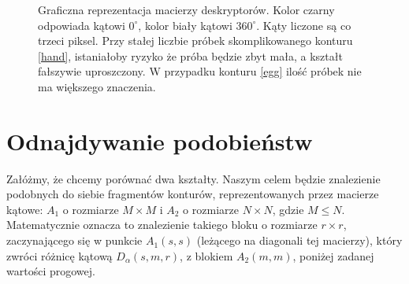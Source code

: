 \begin{figure}[h!] \centering {}
   \caption{Graficzna reprezentacja macierzy deskryptorów. Kolor
  czarny odpowiada kątowi $0^\circ$, kolor biały kątowi $360^\circ$. Kąty
  liczone są co trzeci piksel. Przy stałej liczbie próbek skomplikowanego
  konturu \ref{hand}, istaniałoby ryzyko że próba będzie zbyt mała, a kształt
  fałszywie uproszczony. W przypadku konturu \ref{egg} ilość próbek nie ma
  większego znaczenia.} \end{figure}

\section{Odnajdywanie podobieństw}

Załóżmy, że chcemy porównać dwa kształty. Naszym celem będzie znalezienie
podobnych do siebie fragmentów konturów, reprezentowanych przez macierze
kątowe: $A_{1}$ o rozmiarze $M \times M$ i $A_{2}$ o rozmiarze $N \times N$,
gdzie $M \leq N$.  Matematycznie oznacza to znalezienie takiego bloku o
rozmiarze $r \times r$, zaczynającego się w punkcie $A_1(s,s)$ (leżącego na
diagonali tej macierzy), który zwróci różnicę kątową $D_{\alpha}(s,m,r)$, z
blokiem $A_{2}(m,m)$, poniżej zadanej wartości progowej. 

